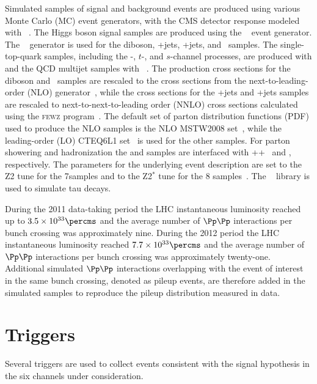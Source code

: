\documentclass[11pt,twoside,a4paper,cmspaper,final,collab]{cms-tdr}
\begin{document}
Simulated samples of signal and background events are produced using
various Monte Carlo (MC) event generators, with the CMS detector response modeled
with \GEANTfour~\cite{GEANT4}. The Higgs boson signal samples are
produced using the {\POWHEG}~\cite{POWHEG} event generator.
The {}~\cite{Alwall:2011uj} generator is used for the diboson, \PW+jets, \cPZ+jets, and \ttbar\ samples.
The single-top-quark samples, including the \cPqt\PW-, $t$-, and $s$-channel processes, are produced with {\POWHEG} and the QCD
multijet samples with {}~\cite{Sjostrand:2006za}.  The production
cross sections for the diboson and \ttbar\ samples are rescaled to the
cross sections from the next-to-leading-order (NLO) {\MCFM} generator~\cite{Campbell:2010ff},
while the cross sections for the \PW+jets and \cPZ+jets samples are rescaled
to next-to-next-to-leading order (NNLO) cross sections calculated using the \textsc{fewz} program~\cite{Gavin:2010az,Li:2012wna,Gavin:2012sy}. The default set of parton distribution
functions (PDF) used to produce the NLO {\POWHEG} samples is
the NLO {MSTW2008} set~\cite{Martin:2009iq}, while the leading-order (LO)
CTEQ6L1 set~\cite{Pumplin:2002vw} is used for the other samples.
For parton showering and hadronization the {\POWHEG} and {\MADGRAPH} samples are interfaced with
 {\HERWIG++}~\cite{Bahr:2008pv} and  {\PYTHIA},
 respectively. The {\PYTHIA} parameters for the underlying event description are set to the Z2
tune for the 7\TeV samples and to the Z2$^*$ tune for the 8\TeV
samples~\cite{Chatrchyan:2011id}. The {\TAUOLA}~\cite{Jadach1991275} library is used to simulate tau decays.

During the 2011 data-taking period the LHC instantaneous luminosity reached up to $3.5\times 10^{33}\percms$ and
the average number of $\Pp\Pp$ interactions per bunch crossing was
approximately nine. During the 2012 period the LHC instantaneous luminosity
reached $7.7\times 10^{33}\percms$ and
the average number of $\Pp\Pp$ interactions per bunch crossing was
approximately twenty-one. Additional simulated $\Pp\Pp$ interactions overlapping with the event of interest in the same bunch crossing,
denoted as pileup events, are therefore added in the simulated samples to reproduce the pileup
distribution measured in data.


\section{Triggers}\label{sec:hbb_Triggers}


Several triggers are used to collect events consistent with
the signal hypothesis in the six channels under consideration.
\end{document}
